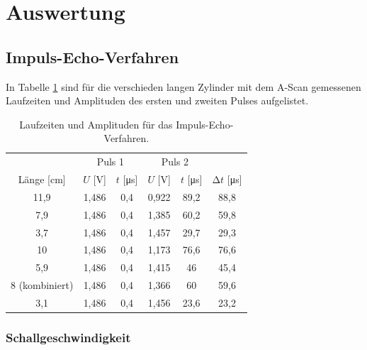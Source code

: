 \section{Auswertung}
\label{sec:Auswertung}

\subsection{Impuls-Echo-Verfahren}

In Tabelle \ref{tab:echo} sind für die verschieden langen Zylinder mit dem A-Scan gemessenen Laufzeiten und Amplituden des ersten und zweiten Pulses aufgelistet.
\begin{table}
  \centering
  \caption{Laufzeiten und Amplituden für das Impuls-Echo-Verfahren.}
  \label{tab:echo}
  \begin{tabular}{c | c c | c c | c}
    \toprule
    & \multicolumn{2}{c}{Puls 1} & \multicolumn{2}{c}{Puls 2} & \\
    Länge [\si{\centi\meter}] & $U$ [\si{\volt}] & $t$ [\si{\micro\second}] & $U$ [\si{\volt}] & $t$ [\si{\micro\second}] & $\increment t$ [\si{\micro\second}] \\
    \midrule
    11,9 & 1,486 & 0,4 & 0,922 & 89,2 & 88,8 \\
     7,9 & 1,486 & 0,4 & 1,385 & 60,2 & 59,8 \\
     3,7 & 1,486 & 0,4 & 1,457 & 29,7 & 29,3 \\
      10 & 1,486 & 0,4 & 1,173 & 76,6 & 76,6 \\
     5,9 & 1,486 & 0,4 & 1,415 &   46 & 45,4 \\
       8 (kombiniert) & 1,486 & 0,4 & 1,366 &   60 & 59,6 \\
     3,1 & 1,486 & 0,4 & 1,456 & 23,6 & 23,2 \\
    \bottomrule
  \end{tabular}
\end{table}

\subsubsection{Schallgeschwindigkeit}
\label{sec:geschw}

